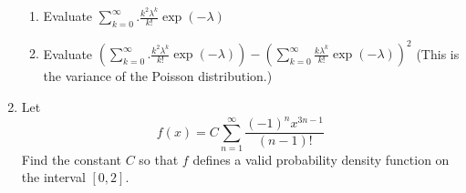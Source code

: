 \documentclass{article}
\begin{document}
\begin{enumerate}
\begin{enumerate}
                            \item Evaluate $\displaystyle \sum_{k=0}^\infty. \frac{k^2\lambda^k}{k!}\exp(-\lambda)$
                            \item Evaluate $\displaystyle \left( \sum_{k=0}^\infty. \frac{k^2\lambda^k}{k!}\exp(-\lambda)\right) - \left(\sum_{k=0}^\infty \frac{k\lambda^k}{k!}\exp(-\lambda)\right)^2$ (This is the variance of the Poisson distribution.)
                        \end{enumerate}
                    \item Let $$\displaystyle f(x)= C\sum_{n=1}^\infty \frac{(-1)^nx^{3n-1}}{(n-1)!}$$  Find the constant $C$ so that $f$ defines a valid probability density function on the interval $[0,2]$.
                \end{enumerate}
\end{document}
